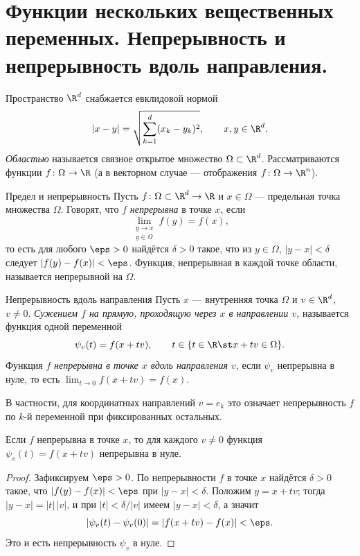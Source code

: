 
\section{Функции нескольких вещественных переменных. Непрерывность и непрерывность вдоль направления.}

Пространство $\R^d$ снабжается евклидовой нормой
\[
|x-y|=\sqrt{\sum_{k=1}^{d}(x_k-y_k)^2},\qquad x,y\in\R^d.
\]
\emph{Областью} называется связное открытое множество $\Omega\subset\R^d$. Рассматриваются функции $f\colon\Omega\to\R$ (а в векторном случае --- отображения $f\colon\Omega\to\R^n$).

\begin{Definition}{Предел и непрерывность}{}
	Пусть $f\colon\Omega\subset\R^d\to\R$ и $x\in\Omega$ --- предельная точка множества $\Omega$. Говорят, что $f$ \emph{непрерывна} в точке $x$, если
	\[
	\lim_{\substack{y\to x\\ y\in\Omega}} f(y)=f(x),
	\]
	то есть для любого $\eps>0$ найдётся $\delta>0$ такое, что из $y\in\Omega$, $|y-x|<\delta$ следует $|f(y)-f(x)|<\eps$. Функция, непрерывная в каждой точке области, называется непрерывной на $\Omega$.
\end{Definition}

\begin{Definition}{Непрерывность вдоль направления}{}
	Пусть $x$ --- внутренняя точка $\Omega$ и $v\in\R^d$, $v\ne0$. \emph{Сужением $f$ на прямую, проходящую через $x$ в направлении $v$,} называется функция одной переменной
	\[
	\psi_v(t)=f(x+tv),\qquad t\in\{t\in\R\st x+tv\in\Omega\}.
	\]
	Функция $f$ \emph{непрерывна в точке $x$ вдоль направления $v$}, если $\psi_v$ непрерывна в нуле, то есть $\displaystyle\lim_{t\to0}f(x+tv)=f(x)$.

	В частности, для координатных направлений $v=e_k$ это означает непрерывность $f$ по $k$-й переменной при фиксированных остальных.
\end{Definition}

\begin{Statement}{}{}
	Если $f$ непрерывна в точке $x$, то для каждого $v\ne0$ функция $\psi_v(t)=f(x+tv)$ непрерывна в нуле.
\end{Statement}

\begin{proof}
	Зафиксируем $\eps>0$. По непрерывности $f$ в точке $x$ найдётся $\delta>0$ такое, что $|f(y)-f(x)|<\eps$ при $|y-x|<\delta$. Положим $y=x+tv$; тогда $|y-x|=|t|\,|v|$, и при $|t|<\delta/|v|$ имеем $|y-x|<\delta$, а значит
	\[
	|\psi_v(t)-\psi_v(0)|=|f(x+tv)-f(x)|<\eps.
	\]
	Это и есть непрерывность $\psi_v$ в нуле.
\end{proof}

